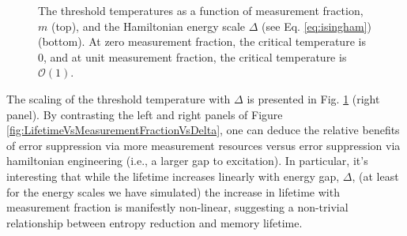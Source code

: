 \documentclass[twocolumn,superscriptaddress,aps,prb,floatfix]{revtex4-1}
\newcommand{\figref}[1]{Fig. \ref{#1}}
\begin{document}
\begin{figure}
\begin{center}
\end{center}
\caption[justification=raggedright]{The threshold temperatures as a function of measurement fraction, $m$ (top),  and the Hamiltonian energy scale $\Delta$ (see Eq. \ref{eq:isingham})(bottom).  At zero measurement fraction, the critical temperature is 0, and at unit measurement fraction, the critical temperature is $\mathcal{O}(1)$.}
\label{fig:CriticalTempVsMeasurementFraction}
\end{figure}



The scaling of the threshold temperature with $\Delta$ is presented in  \figref{fig:CriticalTempVsMeasurementFraction} (right panel). By contrasting the left and right panels of Figure \ref{fig:LifetimeVsMeasurementFractionVsDelta}, one can deduce the relative benefits of error suppression via more measurement resources versus error suppression via hamiltonian engineering (i.e., a larger gap to excitation).  In particular, it's interesting that while the lifetime increases linearly with energy gap, $\Delta$, (at least for the energy scales we have simulated) the increase in lifetime with measurement fraction is manifestly non-linear, suggesting a non-trivial relationship between entropy reduction and memory lifetime.
\end{document}
